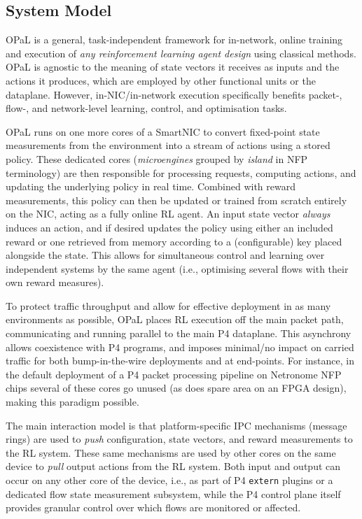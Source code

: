 \documentclass[sigconf,natbib=false]{acmart}
\newcommand{\approachshort}{OPaL}
\begin{document}
\subsection{System Model}
\approachshort{} is a general, task-independent framework for in-network, online training and execution of \emph{any reinforcement learning agent design} using classical methods.
\approachshort{} is agnostic to the meaning of state vectors it receives as inputs and the actions it produces, which are employed by other functional units or the dataplane.
However, in-NIC/in-network execution specifically benefits packet-, flow-, and network-level learning, control, and optimisation tasks.

\approachshort{} runs on one more cores of a SmartNIC to convert fixed-point state measurements from the environment into a stream of actions using a stored policy.
These dedicated cores (\emph{microengines} grouped by \emph{island} in NFP terminology) are then responsible for processing requests, computing actions, and updating the underlying policy in real time.
Combined with reward measurements, this policy can then be updated or trained from scratch entirely on the NIC, acting as a fully online RL agent.
An input state vector \emph{always} induces an action, and if desired updates the policy using either an included reward or one retrieved from memory according to a (configurable) key placed alongside the state.
This allows for simultaneous control and learning over independent systems by the same agent (i.e., optimising several flows with their own reward measures).


To protect traffic throughput and allow for effective deployment in as many environments as possible, \approachshort{} places RL execution off the main packet path, communicating and running parallel to the main P4 dataplane.
This asynchrony allows coexistence with P4 programs, and imposes minimal/no impact on carried traffic for both bump-in-the-wire deployments and at end-points.
For instance, in the default deployment of a P4 packet processing pipeline on Netronome NFP chips several of these cores go unused (as does spare area on an FPGA design), making this paradigm possible.

The main interaction model is that platform-specific IPC mechanisms (message rings) are used to \emph{push} configuration, state vectors, and reward measurements to the RL system.
These same mechanisms are used by other cores on the same device to \emph{pull} output actions from the RL system.
Both input and output can occur on any other core of the device, i.e., as part of P4 \texttt{extern} plugins or a dedicated flow state measurement subsystem, while the P4 control plane itself provides granular control over which flows are monitored or affected.
\end{document}
